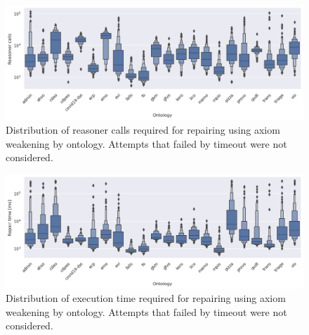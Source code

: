 \begin{figure}[htbp]
  \centering
  \includegraphics[width=\textwidth]{resources/calls-ontology-violin.png}
  \caption{Distribution of reasoner calls required for repairing using axiom weakening by ontology. Attempts that failed by timeout were not considered.}
\end{figure}

\begin{figure}[htbp]
  \centering
  \includegraphics[width=\textwidth]{resources/time-ontology-violin.png}
  \caption{Distribution of execution time required for repairing using axiom weakening by ontology. Attempts that failed by timeout were not considered.}
\end{figure}

